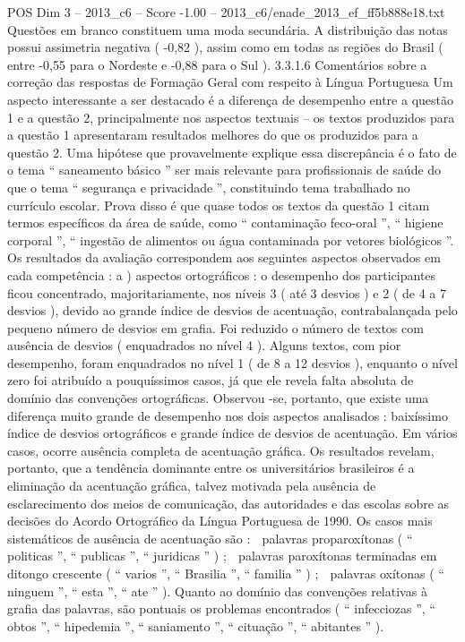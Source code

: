 \begin{textsample}{POS Dim 3 – 2013\_c6 – Score -1.00 – 2013\_c6/enade\_2013\_ef\_ff5b888e18.txt}
Questões em branco constituem uma moda secundária.
A distribuição das notas possui assimetria negativa ( -0,82 ), assim como em todas as regiões do Brasil ( entre -0,55 para o Nordeste e -0,88 para o Sul ). 3.3.1.6 Comentários sobre a correção das respostas de Formação Geral com respeito à Língua Portuguesa Um aspecto interessante a ser destacado é a diferença de desempenho entre a questão 1 e a questão 2, principalmente nos aspectos textuais – os textos produzidos para a questão 1 apresentaram resultados melhores do que os produzidos para a questão 2.
Uma hipótese que provavelmente explique essa discrepância é o fato de o tema “ saneamento básico ” ser mais relevante para profissionais de saúde do que o tema “ segurança e privacidade ”, constituindo tema trabalhado no currículo escolar.
Prova disso é que quase todos os textos da questão 1 citam termos específicos da área de saúde, como “ contaminação feco-oral ”, “ higiene corporal ”, “ ingestão de alimentos ou água contaminada por vetores biológicos ”.
Os resultados da avaliação correspondem aos seguintes aspectos observados em cada competência : a ) aspectos ortográficos : o desempenho dos participantes ficou concentrado, majoritariamente, nos níveis 3 ( até 3 desvios ) e 2 ( de 4 a 7 desvios ), devido ao grande índice de desvios de acentuação, contrabalançada pelo pequeno número de desvios em grafia.
Foi reduzido o número de textos com ausência de desvios ( enquadrados no nível 4 ).
Alguns textos, com pior desempenho, foram enquadrados no nível 1 ( de 8 a 12 desvios ), enquanto o nível zero foi atribuído a pouquíssimos casos, já que ele revela falta absoluta de domínio das convenções ortográficas.
Observou -se, portanto, que existe uma diferença muito grande de desempenho nos dois aspectos analisados : baixíssimo índice de desvios ortográficos e grande índice de desvios de acentuação.
Em vários casos, ocorre ausência completa de acentuação gráfica.
Os resultados revelam, portanto, que a tendência dominante entre os universitários brasileiros é a eliminação da acentuação gráfica, talvez motivada pela ausência de esclarecimento dos meios de comunicação, das autoridades e das escolas sobre as decisões do Acordo Ortográfico da Língua Portuguesa de 1990.
Os casos mais sistemáticos de ausência de acentuação são :  palavras proparoxítonas ( “ politicas ”, “ publicas ”, “ juridicas ” ) ;  palavras paroxítonas terminadas em ditongo crescente ( “ varios ”, “ Brasilia ”, “ familia ” ) ;  palavras oxítonas ( “ ninguem ”, “ esta ”, “ ate ” ).
Quanto ao domínio das convenções relativas à grafia das palavras, são pontuais os problemas encontrados ( “ infecciozas ”, “ obtos ”, “ hipedemia ”, “ saniamento ”, “ cituação ”, “ abitantes ” ).

\end{textsample}
